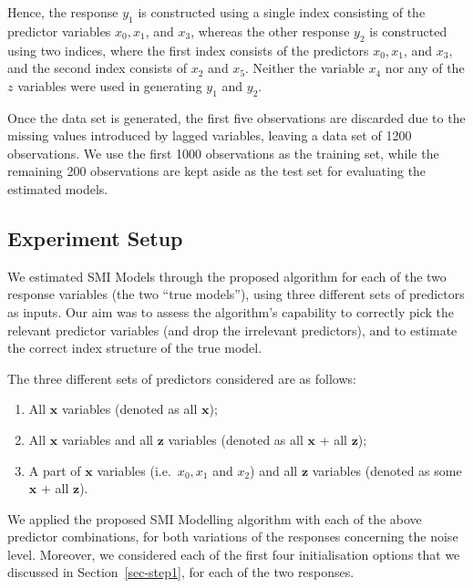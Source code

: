 \documentclass[
  11pt,
  a4paper,
]{article}
\providecommand{\tightlist}{%
  \setlength{\itemsep}{0pt}\setlength{\parskip}{0pt}}\usepackage{longtable,booktabs,array}
\begin{document}
Hence, the response \(y_{1}\) is constructed using a single index
consisting of the predictor variables \(x_{0}, x_{1}\), and \(x_{3}\),
whereas the other response \(y_{2}\) is constructed using two indices,
where the first index consists of the predictors \(x_{0}, x_{1}\), and
\(x_{3}\), and the second index consists of \(x_{2}\) and \(x_{5}\).
Neither the variable \(x_{4}\) nor any of the \(z\) variables were used
in generating \(y_{1}\) and \(y_{2}\).

Once the data set is generated, the first five observations are
discarded due to the missing values introduced by lagged variables,
leaving a data set of 1200 observations. We use the first 1000
observations as the training set, while the remaining 200 observations
are kept aside as the test set for evaluating the estimated models.

\subsection{Experiment Setup}\label{sec-exp}

We estimated SMI Models through the proposed algorithm for each of the
two response variables (the two ``true models''), using three different
sets of predictors as inputs. Our aim was to assess the algorithm's
capability to correctly pick the relevant predictor variables (and drop
the irrelevant predictors), and to estimate the correct index structure
of the true model.

The three different sets of predictors considered are as follows:

\begin{enumerate}
\def\labelenumi{\arabic{enumi}.}
\tightlist
\item
  All \(\bm{x}\) variables (denoted as all \(\bm{x}\));
\item
  All \(\bm{x}\) variables and all \(\bm{z}\) variables (denoted as all
  \(\bm{x}\) + all \(\bm{z}\));
\item
  A part of \(\bm{x}\) variables (i.e.~\(x_{0}, x_{1}\) and \(x_{2}\))
  and all \(\bm{z}\) variables (denoted as some \(\bm{x}\) + all
  \(\bm{z}\)).
\end{enumerate}

We applied the proposed SMI Modelling algorithm with each of the above
predictor combinations, for both variations of the responses concerning
the noise level. Moreover, we considered each of the first four
initialisation options that we discussed in Section~\ref{sec-step1}, for
each of the two responses.
\end{document}
